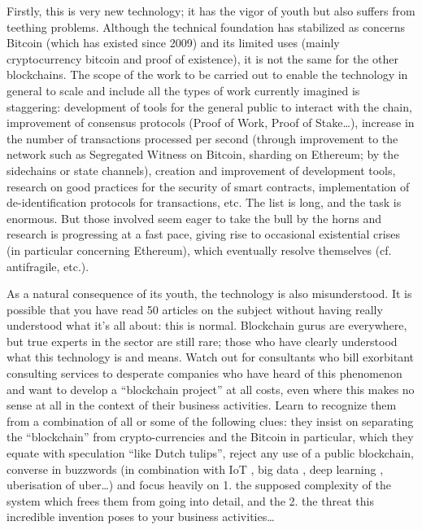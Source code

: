 \documentclass{tnreport}
\begin{document}
Firstly, this is very new technology; it has the vigor of youth but also suffers from teething problems. 
Although the technical foundation has stabilized as concerns Bitcoin (which has existed since 2009) and its limited uses (mainly cryptocurrency bitcoin and proof of existence), it is not the same for the other blockchains. 
The scope of the work to be carried out to enable the technology in general to scale and include all the types of work currently imagined is staggering: development of tools for the general public to interact with the chain, improvement of consensus protocols (Proof of Work, Proof of Stake…), increase in the number of transactions processed per second (through improvement to the network such as Segregated Witness on Bitcoin, sharding on Ethereum; by the sidechains or state channels), creation and improvement of development tools, research on good practices for the security of smart contracts, implementation of de-identification protocols for transactions, etc. 
The list is long, and the task is enormous. 
But those involved seem eager to take the bull by the horns and research is progressing at a fast pace, giving rise to occasional existential crises (in particular concerning Ethereum), which eventually resolve themselves (cf. antifragile, etc.).

As a natural consequence of its youth, the technology is also misunderstood. 
It is possible that you have read 50 articles on the subject without having really understood what it’s all about: this is normal. 
Blockchain gurus are everywhere, but true experts in the sector are still rare; those who have clearly understood what this technology is and means. 
Watch out for consultants who bill exorbitant consulting services to desperate companies who have heard of this phenomenon and want to develop a “blockchain project” at all costs, even where this makes no sense at all in the context of their business activities. 
Learn to recognize them from a combination of all or some of the following clues: they insist on separating the “blockchain” from crypto-currencies and the Bitcoin in particular, which they equate with speculation “like Dutch tulips”, reject any use of a public blockchain, converse in buzzwords 
(in combination with IoT , big data , deep learning , uberisation of uber…) and focus heavily on 
1. the supposed complexity of the system which frees them from going into detail, and the 
2. the threat this incredible invention poses to your business activities…
\end{document}
